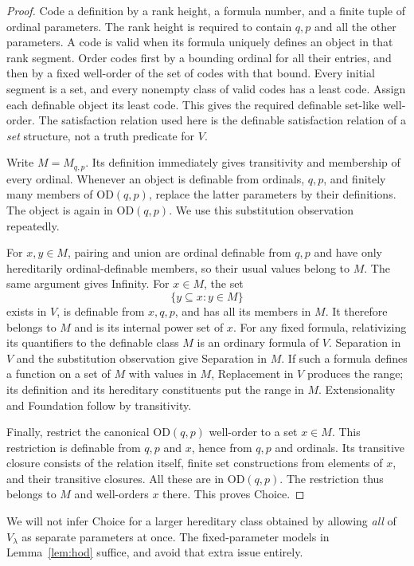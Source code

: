 \documentclass[11pt,letterpaper]{article}
\theoremstyle{definition}
\numberwithin{equation}{section}
\newcommand{\OD}{\mathrm{OD}}
\begin{document}
\begin{proof}
Code a definition by a rank height, a formula number, and a finite tuple
of ordinal parameters. The rank height is required to contain $q,p$
and all the other parameters. A code is valid when its formula uniquely
defines an object in that rank segment. Order codes first by a bounding
ordinal for all their entries, and then by a fixed well-order of the
set of codes with that bound. Every initial segment is a set, and every
nonempty class of valid codes has a least code. Assign each definable
object its least code. This gives the required definable set-like
well-order. The satisfaction relation used here is the definable
satisfaction relation of a \emph{set} structure, not a truth predicate
for $V$.

Write $M=M_{q,p}$. Its definition immediately gives transitivity and
membership of every ordinal. Whenever an object is definable from
ordinals, $q,p$, and finitely many members of $\OD(q,p)$, replace the
latter parameters by their definitions. The object is again in
$\OD(q,p)$. We use this substitution observation repeatedly.

For $x,y\in M$, pairing and union are ordinal definable from $q,p$ and
have only hereditarily ordinal-definable members, so their usual values
belong to $M$. The same argument gives Infinity. For $x\in M$, the set
\[
 \{y\subseteq x:y\in M\}
\]
exists in $V$, is definable from $x,q,p$, and has all its members in $M$.
It therefore belongs to $M$ and is its internal power set of $x$.
For any fixed formula, relativizing its quantifiers to the definable
class $M$ is an ordinary formula of $V$. Separation in $V$ and the
substitution observation give Separation in $M$. If such a formula
defines a function on a set of $M$ with values in $M$, Replacement in
$V$ produces the range; its definition and its hereditary constituents
put the range in $M$. Extensionality and Foundation follow by
transitivity.

Finally, restrict the canonical $\OD(q,p)$ well-order to a set $x\in M$.
This restriction is definable from $q,p$ and $x$, hence from $q,p$ and
ordinals. Its transitive closure consists of the relation itself,
finite set constructions from elements of $x$, and their transitive
closures. All these are in $\OD(q,p)$. The restriction thus belongs to
$M$ and well-orders $x$ there. This proves Choice.
\end{proof}

We will not infer Choice for a larger hereditary class obtained by
allowing \emph{all} of $V_\lambda$ as separate parameters at once.
The fixed-parameter models in Lemma~\ref{lem:hod} suffice, and avoid
that extra issue entirely.
\end{document}
